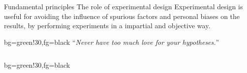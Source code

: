 \documentclass[t]{beamer}
\begin{document}
\begin{ftst}
{Fundamental principles}
{The role of experimental design}
Experimental design is useful for avoiding the influence of spurious factors and personal biases on the results, by performing experiments in a impartial and objective way.
\begin{colorblock}{}{bg=green!30,fg=black}
	\vhalf
	\centering``\textit{Never have too much love for your hypotheses.}''
	\vspace{0.5em}
\end{colorblock}
\vone
\begin{columns}[T] 
	\begin{colorblock}{}{bg=green!30,fg=black}
		\vspace{0.5em}
	\end{colorblock}
\end{columns}
\end{ftst}

\end{document}
